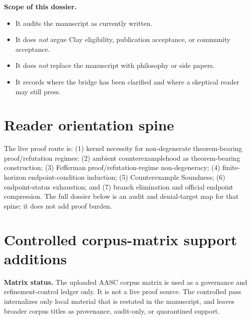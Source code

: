 \documentclass[11pt,letterpaper]{article}
\begin{document}
\begin{scopebox}
\textbf{Scope of this dossier.}
\begin{itemize}
\item It audits the manuscript as currently written.
\item It does \emph{not} argue Clay eligibility, publication acceptance, or community acceptance.
\item It does \emph{not} replace the manuscript with philosophy or side papers.
\item It records where the bridge has been clarified and where a skeptical reader may still press.
\end{itemize}
\end{scopebox}

\tableofcontents
\newpage



\section{Reader orientation spine}
\begin{spinebox}
The live proof route is: (1) kernel necessity for non-degenerate theorem-bearing proof/refutation regimes; (2) ambient counterexamplehood as theorem-bearing construction; (3) Fefferman proof/refutation-regime non-degeneracy; (4) finite-horizon endpoint-condition induction; (5) Counterexample Soundness; (6) endpoint-status exhaustion; and (7) branch elimination and official endpoint compression. The full dossier below is an audit and denial-target map for that spine; it does not add proof burden.
\end{spinebox}

\section{Controlled corpus-matrix support additions}

\begin{freezebox}
\textbf{Matrix status.} The uploaded AASC corpus matrix is used as a governance and refinement-control ledger only. It is not a live proof source. The controlled pass internalizes only local material that is restated in the manuscript, and leaves broader corpus titles as provenance, audit-only, or quarantined support.
\end{freezebox}
\end{document}
